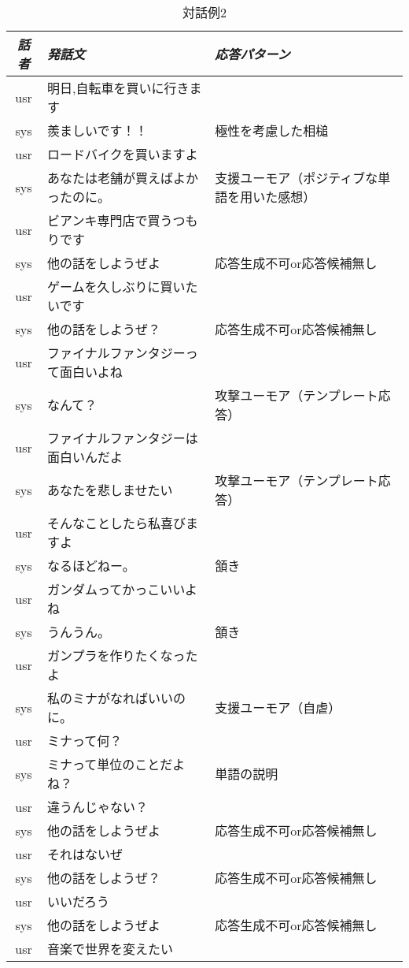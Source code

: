 \begin{longtable}{| c | p{} | p{}|}
\caption{対話例2}
\endhead
\hline
{\em 話者} & {\em 発話文} & {\em 応答パターン}\\
\hline
\hline
usr & 明日,自転車を買いに行きます & \\ 
sys & 羨ましいです！！ & 極性を考慮した相槌\\
usr & ロードバイクを買いますよ & \\
sys & あなたは老舗が買えばよかったのに。 & 支援ユーモア（ポジティブな単語を用いた感想） \\
usr & ビアンキ専門店で買うつもりです &\\
sys & 他の話をしようぜよ & 応答生成不可or応答候補無し\\
usr & ゲームを久しぶりに買いたいです & \\
sys & 他の話をしようぜ？ & 応答生成不可or応答候補無し\\
usr & ファイナルファンタジーって面白いよね & \\
sys & なんて？ & 攻撃ユーモア（テンプレート応答）\\
usr & ファイナルファンタジーは面白いんだよ & \\
sys & あなたを悲しませたい & 攻撃ユーモア（テンプレート応答）\\
usr & そんなことしたら私喜びますよ & \\
sys & なるほどねー。 & 頷き\\
usr & ガンダムってかっこいいよね & \\
sys & うんうん。 & 頷き\\
usr & ガンプラを作りたくなったよ & \\
sys & 私のミナがなればいいのに。 & 支援ユーモア（自虐）\\
usr & ミナって何？ & \\
sys & ミナって単位のことだよね？ & 単語の説明\\
usr & 違うんじゃない？ & \\
sys & 他の話をしようぜよ & 応答生成不可or応答候補無し\\
usr & それはないぜ & \\
sys & 他の話をしようぜ？ & 応答生成不可or応答候補無し\\
usr & いいだろう & \\
sys & 他の話をしようぜよ & 応答生成不可or応答候補無し\\
usr & 音楽で世界を変えたい & \\

\end{longtable}
